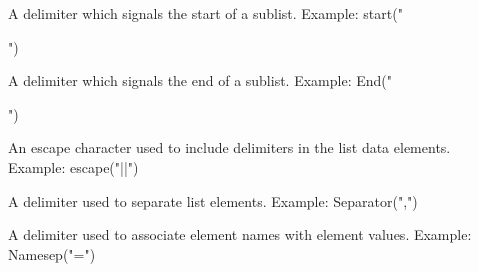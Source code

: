 \begin{description}
\item[Start]

A delimiter which signals the start of a sublist. Example: start("{")

\item[End]

A delimiter which signals the end of a sublist. Example: End("}")

\item[Escape] 

An escape character used to include delimiters in the list data elements. Example: escape("||")

\item[Separator]

A delimiter used to separate list elements. Example: Separator(",")

\item[NameSeparator]

A delimiter used to associate element names with element values. Example: Namesep("=")
\end{description}

